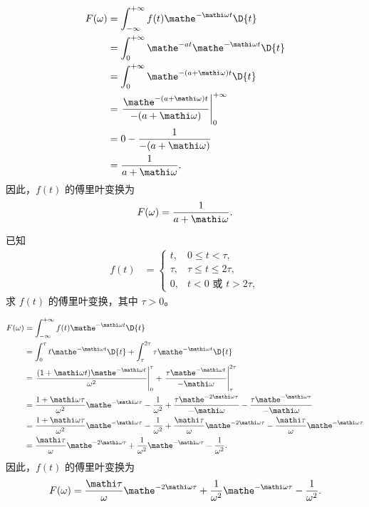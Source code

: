 \begin{solution}
    \begin{align*}
        F(\omega) & = \int_{-\infty}^{+\infty}f(t)\mathe^{-\mathi\omega t}\D{t} \\
        & = \int_{0}^{+\infty}\mathe^{-at}\mathe^{-\mathi\omega t}\D{t} \\
        & = \int_{0}^{+\infty}\mathe^{-(a+\mathi\omega)t}\D{t} \\
        & = \left.\frac{\mathe^{-(a+\mathi\omega)t}}{-(a+\mathi\omega)}\right|_{0}^{+\infty} \\
        & = 0 - \frac{1}{-(a+\mathi\omega)} \\
        & = \frac{1}{a+\mathi\omega}.
    \end{align*}
    因此，$f(t)$ 的傅里叶变换为
    \begin{align*}
        F(\omega) = \frac{1}{a+\mathi\omega}.
    \end{align*}
\end{solution}

\begin{homework}
    已知
    \begin{align*}
        f(t) &= \begin{cases}
            t, & 0 \le t < \tau, \\
            \tau, & \tau \le t \le 2\tau, \\
            0, & t < 0 \text{ 或 } t > 2\tau,
        \end{cases}
    \end{align*}
    求 $f(t)$ 的傅里叶变换，其中 $\tau > 0$。
\end{homework}

\begin{solution}
    \begin{align*}
        F(\omega) & = \int_{-\infty}^{+\infty}f(t)\mathe^{-\mathi\omega t}\D{t} \\
        & = \int_{0}^{\tau}t\mathe^{-\mathi\omega t}\D{t} + \int_{\tau}^{2\tau}\tau\mathe^{-\mathi\omega t}\D{t} \\
        & = \left.\frac{(1 +\mathi\omega t)\mathe^{-\mathi\omega t}}{\omega^2}\right|_{0}^{\tau} + \left.\frac{\tau\mathe^{-\mathi\omega t}}{-\mathi\omega}\right|_{\tau}^{2\tau} \\
        & = \frac{1 + \mathi\omega\tau}{\omega^2}\mathe^{-\mathi\omega\tau} - \frac{1}{\omega^2} + \frac{\tau\mathe^{-2\mathi\omega\tau}}{-\mathi\omega} - \frac{\tau\mathe^{-\mathi\omega\tau}}{-\mathi\omega} \\
        & = \frac{1 + \mathi\omega\tau}{\omega^2}\mathe^{-\mathi\omega\tau} - \frac{1}{\omega^2} + \frac{\mathi\tau}{\omega}\mathe^{-2\mathi\omega \tau} - \frac{\mathi\tau}{\omega}\mathe^{-\mathi \omega \tau} \\
        & = \frac{\mathi\tau}{\omega}\mathe^{-2\mathi\omega\tau} + \frac{1}{\omega^2}\mathe^{-\mathi\omega\tau} - \frac{1}{\omega^2}.
    \end{align*}
    因此，$f(t)$ 的傅里叶变换为
    \begin{align*}
        F(\omega) = \frac{\mathi\tau}{\omega}\mathe^{-2\mathi\omega\tau} + \frac{1}{\omega^2}\mathe^{-\mathi\omega\tau} - \frac{1}{\omega^2}.
    \end{align*}
\end{solution}
